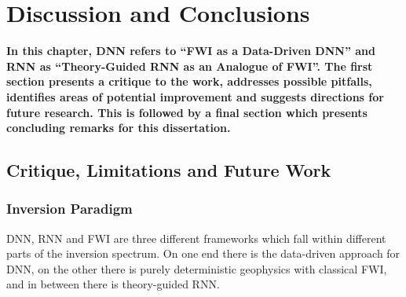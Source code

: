 \chapter{Discussion and Conclusions}
\textbf{In this chapter, DNN refers to ``FWI as a Data-Driven DNN'' and RNN as ``Theory-Guided RNN as an Analogue of FWI''. The first section presents a critique to the work, addresses possible pitfalls, identifies areas of potential improvement and suggests directions for future research. This is followed by a final section which presents concluding remarks for this dissertation.}

\section{Critique, Limitations and Future Work}
\subsection{Inversion Paradigm}
DNN, RNN and FWI are three different frameworks which fall within different parts of the inversion spectrum. On one end there is the data-driven approach for DNN, on the other there is purely deterministic geophysics with classical FWI, and in between there is theory-guided RNN.



